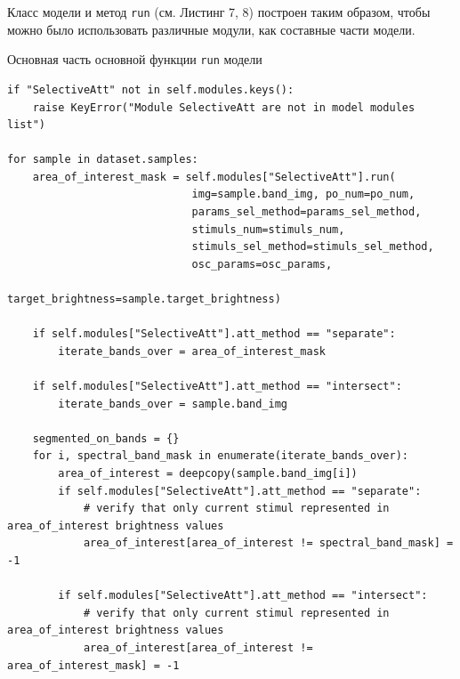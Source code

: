 \documentclass[14pt, russian]{scrartcl}
\begin{document}
Класс модели и метод \texttt{run} (см. Листинг 7, 8) построен таким образом, чтобы можно было использовать различные модули, как составные части модели.
\begin{listing}[!htt]
    \caption{Основная часть основной функции \texttt{run} модели}
    \label{lst:model_run}
    \begin{verbatim}
if "SelectiveAtt" not in self.modules.keys():
    raise KeyError("Module SelectiveAtt are not in model modules list")
        
for sample in dataset.samples:
    area_of_interest_mask = self.modules["SelectiveAtt"].run(
                             img=sample.band_img, po_num=po_num, 
                             params_sel_method=params_sel_method, 
                             stimuls_num=stimuls_num,
                             stimuls_sel_method=stimuls_sel_method,
                             osc_params=osc_params,
                             target_brightness=sample.target_brightness)

    if self.modules["SelectiveAtt"].att_method == "separate":
        iterate_bands_over = area_of_interest_mask

    if self.modules["SelectiveAtt"].att_method == "intersect":
        iterate_bands_over = sample.band_img

    segmented_on_bands = {}
    for i, spectral_band_mask in enumerate(iterate_bands_over):       
        area_of_interest = deepcopy(sample.band_img[i])
        if self.modules["SelectiveAtt"].att_method == "separate":
            # verify that only current stimul represented in area_of_interest brightness values
            area_of_interest[area_of_interest != spectral_band_mask] = -1

        if self.modules["SelectiveAtt"].att_method == "intersect":
            # verify that only current stimul represented in area_of_interest brightness values
            area_of_interest[area_of_interest != area_of_interest_mask] = -1
    \end{verbatim}
\end{listing}
\end{document}
